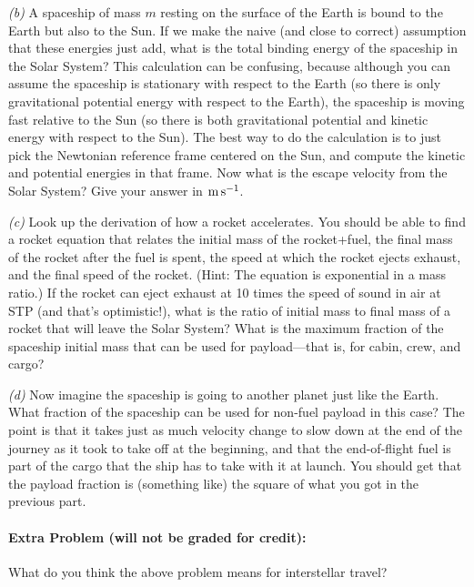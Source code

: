 \documentclass[12pt]{article}
\begin{document}
\textsl{(b)} A spaceship of mass $m$ resting on the surface of the
Earth is bound to the Earth but also to the Sun. If we make
the naive (and close to correct) assumption that these energies just
add, what is the total binding energy of the spaceship in the Solar
System? This calculation can be confusing, because although you can assume
the spaceship is stationary with respect to the Earth (so there is
only gravitational potential energy with respect to the Earth), the
spaceship is moving fast relative to the Sun (so there is both
gravitational potential and kinetic energy with respect to the
Sun). The best way to do the calculation is to just pick the Newtonian reference
frame centered on the Sun, and compute the kinetic and potential
energies in that frame. Now what is the escape velocity from the Solar
System? Give your answer in $\mathrm{m}\,\mathrm{s}^{-1}$.

\textsl{(c)} Look up the derivation of how a rocket accelerates. You
should be able to find a rocket equation that relates the initial mass
of the rocket+fuel, the final mass of the rocket after the fuel is
spent, the speed at which the rocket ejects exhaust, and the final
speed of the rocket. (Hint: The equation is exponential in a mass
ratio.) If the rocket can eject exhaust at 10 times the speed of sound
in air at STP (and that's optimistic!), what is the ratio of initial
mass to final mass of a rocket that will leave the Solar System? What
is the maximum fraction of the spaceship initial mass that can be used
for payload---that is, for cabin, crew, and cargo?

\textsl{(d)} Now imagine the spaceship is going to another planet just
like the Earth. What fraction of the spaceship can be used for
non-fuel payload in this case? The point is that it takes just as much
velocity change to slow down at the end of the journey as it took to
take off at the beginning, and that the end-of-flight fuel is part of
the cargo that the ship has to take with it at launch. You should get
that the payload fraction is (something like) the square of what you got in
the previous part.

\paragraph{Extra Problem (will not be graded for credit):}%
What do you think the above problem means for interstellar travel?
\end{document}

